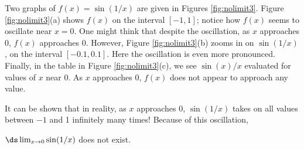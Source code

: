 
%
{%
Two graphs of $f(x) = \sin(1/x)$ are given in Figures \ref{fig:nolimit3}. Figure \ref{fig:nolimit3}(a) shows $f(x)$ on the interval $[-1,1]$; notice how $f(x)$ seems to oscillate near $x=0$. One might think that despite the oscillation, as $x$ approaches 0, $f(x)$ approaches 0. However, Figure \ref{fig:nolimit3}(b) zooms in on $\sin(1/x)$, on the interval $[-0.1,0.1]$. Here the oscillation is even more pronounced. Finally, in the table in Figure \ref{fig:nolimit3}(c), we see $\sin(x)/x$ evaluated for values of $x$ near 0. As $x$ approaches 0, $f(x)$ does not appear to approach any value. 

It can be shown that in reality, as $x$ approaches 0, $\sin(1/x)$ takes on all values between $-1$ and 1 infinitely many times! Because of this oscillation,

 $\ds\lim_{x\to 0}\sin(1/x)$ does not exist.}\\

